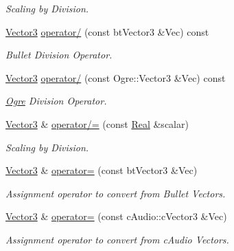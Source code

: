 \begin{DoxyCompactItemize}
\begin{DoxyCompactList}\small\item\em Scaling by Division. \item\end{DoxyCompactList}\item 
\hyperlink{classMezzanine_1_1Vector3}{Vector3} \hyperlink{classMezzanine_1_1Vector3_a5984dc60bffd73e2a067fdb86f847319}{operator/} (const btVector3 \&Vec) const 
\begin{DoxyCompactList}\small\item\em Bullet Division Operator. \item\end{DoxyCompactList}\item 
\hyperlink{classMezzanine_1_1Vector3}{Vector3} \hyperlink{classMezzanine_1_1Vector3_a71faa730673d00224c8f8a3f994dbf79}{operator/} (const Ogre::Vector3 \&Vec) const 
\begin{DoxyCompactList}\small\item\em \hyperlink{namespaceOgre}{Ogre} Division Operator. \item\end{DoxyCompactList}\item 
\hyperlink{classMezzanine_1_1Vector3}{Vector3} \& \hyperlink{classMezzanine_1_1Vector3_a802c948d8fe307bc90b9debedd8fb764}{operator/=} (const \hyperlink{namespaceMezzanine_a726731b1a7df72bf3583e4a97282c6f6}{Real} \&scalar)
\begin{DoxyCompactList}\small\item\em Scaling by Division. \item\end{DoxyCompactList}\item 
\hyperlink{classMezzanine_1_1Vector3}{Vector3} \& \hyperlink{classMezzanine_1_1Vector3_a3d9ad7ab10c631d23a7ded2e791de900}{operator=} (const btVector3 \&Vec)
\begin{DoxyCompactList}\small\item\em Assignment operator to convert from Bullet Vectors. \item\end{DoxyCompactList}\item 
\hyperlink{classMezzanine_1_1Vector3}{Vector3} \& \hyperlink{classMezzanine_1_1Vector3_ace3b3905cba40297982822c2d5659506}{operator=} (const cAudio::cVector3 \&Vec)
\begin{DoxyCompactList}\small\item\em Assignment operator to convert from cAudio Vectors. \item\end{DoxyCompactList}\item 

\end{DoxyCompactItemize}
